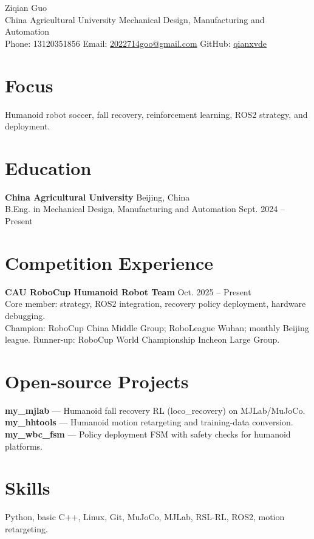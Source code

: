 \documentclass[11pt,a4paper]{article}
\begin{document}
\begin{center}
{\LARGE Ziqian Guo}\\[4pt]
China Agricultural University \textbullet{} Mechanical Design, Manufacturing and Automation\\
Phone: 13120351856 \textbullet{} Email: \href{mailto:2022714goo@gmail.com}{2022714goo@gmail.com} \textbullet{} GitHub: \href{https://github.com/qianxvde}{qianxvde}
\end{center}

\section*{Focus}
Humanoid robot soccer, fall recovery, reinforcement learning, ROS2 strategy, and deployment.

\section*{Education}
\textbf{China Agricultural University} \hfill Beijing, China\\
B.Eng. in Mechanical Design, Manufacturing and Automation \hfill Sept. 2024 -- Present

\section*{Competition Experience}
\textbf{CAU RoboCup Humanoid Robot Team} \hfill Oct. 2025 -- Present\\
Core member: strategy, ROS2 integration, recovery policy deployment, hardware debugging.\\
Champion: RoboCup China Middle Group; RoboLeague Wuhan; monthly Beijing league. Runner-up: RoboCup World Championship Incheon Large Group.

\section*{Open-source Projects}
\textbf{my\_mjlab} --- Humanoid fall recovery RL (loco\_recovery) on MJLab/MuJoCo.\\
\textbf{my\_hhtools} --- Humanoid motion retargeting and training-data conversion.\\
\textbf{my\_wbc\_fsm} --- Policy deployment FSM with safety checks for humanoid platforms.

\section*{Skills}
Python, basic C++, Linux, Git, MuJoCo, MJLab, RSL-RL, ROS2, motion retargeting.
\end{document}
